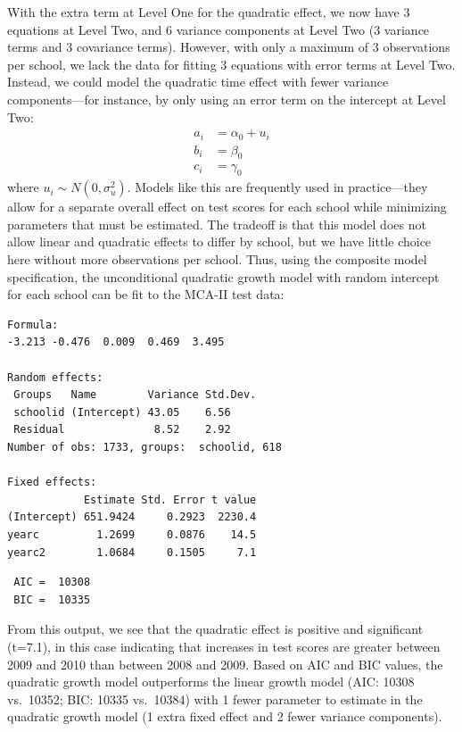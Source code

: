 \documentclass[
]{krantz}
\begin{document}
With the extra term at Level One for the quadratic effect, we now have 3 equations at Level Two, and 6 variance components at Level Two (3 variance terms and 3 covariance terms). However, with only a maximum of 3 observations per school, we lack the data for fitting 3 equations with error terms at Level Two. Instead, we could model the quadratic time effect with fewer variance components---for instance, by only using an error term on the intercept at Level Two:\\
\begin{align*}
a_{i} & = \alpha_{0} + u_{i}\\
b_{i} & = \beta_{0}\\ 
c_{i} & = \gamma_{0}
\end{align*}
where \(u_{i}\sim N(0,\sigma^2_u)\). Models like this are frequently used in practice---they allow for a separate overall effect on test scores for each school while minimizing parameters that must be estimated. The tradeoff is that this model does not allow linear and quadratic effects to differ by school, but we have little choice here without more observations per school. Thus, using the composite model specification, the unconditional quadratic growth model with random intercept for each school can be fit to the MCA-II test data:

\begin{verbatim}
Formula: 
-3.213 -0.476  0.009  0.469  3.495 

Random effects:
 Groups   Name        Variance Std.Dev.
 schoolid (Intercept) 43.05    6.56    
 Residual              8.52    2.92    
Number of obs: 1733, groups:  schoolid, 618

Fixed effects:
            Estimate Std. Error t value
(Intercept) 651.9424     0.2923  2230.4
yearc         1.2699     0.0876    14.5
yearc2        1.0684     0.1505     7.1
\end{verbatim}

\begin{verbatim}
 AIC =  10308 
 BIC =  10335
\end{verbatim}

From this output, we see that the quadratic effect is positive and significant (t=7.1), in this case indicating that increases in test scores are greater between 2009 and 2010 than between 2008 and 2009. Based on AIC and BIC values, the quadratic growth model outperforms the linear growth model (AIC: 10308 vs.~10352; BIC: 10335 vs.~10384) with 1 fewer parameter to estimate in the quadratic growth model (1 extra fixed effect and 2 fewer variance components).
\end{document}
